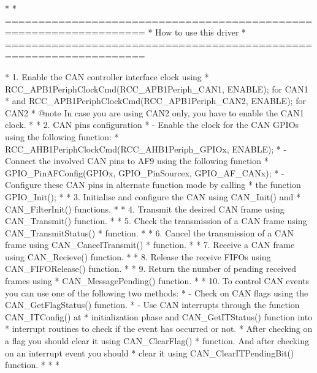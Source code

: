 \begin{DoxyVerb}*                               
*          ===================================================================      
*                                   How to use this driver
*          ===================================================================
              
*          1.  Enable the CAN controller interface clock using 
*                  RCC_APB1PeriphClockCmd(RCC_APB1Periph_CAN1, ENABLE); for CAN1 
*              and RCC_APB1PeriphClockCmd(RCC_APB1Periph_CAN2, ENABLE); for CAN2
*  @note   In case you are using CAN2 only, you have to enable the CAN1 clock.
*     
*          2. CAN pins configuration
*               - Enable the clock for the CAN GPIOs using the following function:
*                   RCC_AHB1PeriphClockCmd(RCC_AHB1Periph_GPIOx, ENABLE);   
*               - Connect the involved CAN pins to AF9 using the following function 
*                   GPIO_PinAFConfig(GPIOx, GPIO_PinSourcex, GPIO_AF_CANx); 
*                - Configure these CAN pins in alternate function mode by calling
*                  the function  GPIO_Init();
*    
*          3.  Initialise and configure the CAN using CAN_Init() and 
*               CAN_FilterInit() functions.   
*               
*          4.  Transmit the desired CAN frame using CAN_Transmit() function.
*         
*          5.  Check the transmission of a CAN frame using CAN_TransmitStatus()
*              function.
*               
*          6.  Cancel the transmission of a CAN frame using CAN_CancelTransmit()
*              function.  
*            
*          7.  Receive a CAN frame using CAN_Recieve() function.
*         
*          8.  Release the receive FIFOs using CAN_FIFORelease() function.
*               
*          9. Return the number of pending received frames using 
*              CAN_MessagePending() function.            
*                   
*          10. To control CAN events you can use one of the following two methods:
*               - Check on CAN flags using the CAN_GetFlagStatus() function.  
*               - Use CAN interrupts through the function CAN_ITConfig() at 
*                 initialization phase and CAN_GetITStatus() function into 
*                 interrupt routines to check if the event has occurred or not.
*             After checking on a flag you should clear it using CAN_ClearFlag()
*             function. And after checking on an interrupt event you should 
*             clear it using CAN_ClearITPendingBit() function.            
*               
*              
*  \end{DoxyVerb}


